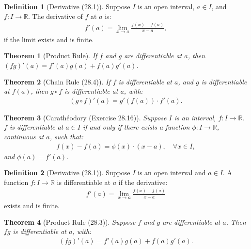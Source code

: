 \documentclass[7pt]{article}
\theoremstyle{definition}
\newtheorem{definition}{Definition}
\theoremstyle{plain}
\newtheorem{theorem}{Theorem}
\begin{document}
\begin{definition}[Derivative (28.1)]
Suppose $ I $ is an open interval, $ a \in I $, and $ f : I \to \mathbb{R} $. The derivative of $ f $ at $ a $ is:
\begin{align}
f'(a) = \lim_{x \to a} \frac{f(x) - f(a)}{x - a},
\end{align}
if the limit exists and is finite.
\end{definition}

\begin{theorem}[Product Rule]
If $ f $ and $ g $ are differentiable at $ a $, then $ (fg)'(a) = f'(a)g(a) + f(a)g'(a) $.
\end{theorem}

\begin{theorem}[Chain Rule (28.4)]
If $ f $ is differentiable at $ a $, and $ g $ is differentiable at $ f(a) $, then $ g \circ f $ is differentiable at $ a $, with:
\begin{align}
(g \circ f)'(a) = g'(f(a)) \cdot f'(a).
\end{align}
\end{theorem}

\begin{theorem}[Carathéodory (Exercise 28.16)]
Suppose $ I $ is an interval, $ f : I \to \mathbb{R} $. $ f $ is differentiable at $ a \in I $ if and only if there exists a function $ \phi : I \to \mathbb{R} $, continuous at $ a $, such that:
\begin{align}
f(x) - f(a) = \phi(x) \cdot (x - a), \quad \forall x \in I,
\end{align}
and $ \phi(a) = f'(a) $.
\end{theorem}

\begin{definition}[Derivative (28.1)]
Suppose $ I $ is an open interval and $ a \in I $. A function $ f : I \to \mathbb{R} $ is differentiable at $ a $ if the derivative:
\begin{align}
f'(a) = \lim_{x \to a} \frac{f(x) - f(a)}{x - a}
\end{align}
exists and is finite.
\end{definition}

\begin{theorem}[Product Rule (28.3)]
Suppose $ f $ and $ g $ are differentiable at $ a $. Then $ fg $ is differentiable at $ a $, with:
\begin{align}
(fg)'(a) = f'(a)g(a) + f(a)g'(a).
\end{align}
\end{theorem}
\end{document}
